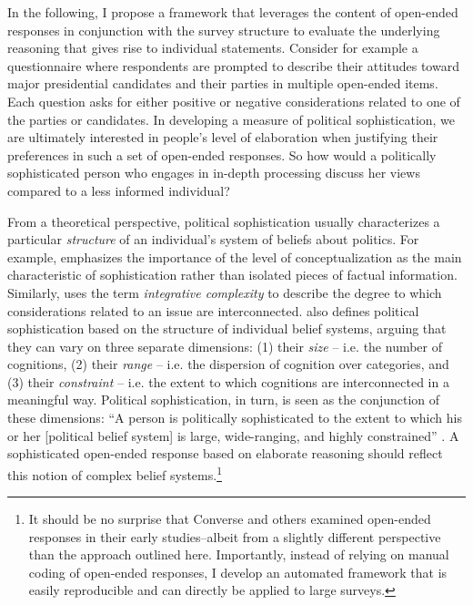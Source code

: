 In the following, I propose a framework that leverages the content of open-ended responses in conjunction with the survey structure to evaluate the underlying reasoning that gives rise to individual statements. Consider for example a questionnaire where respondents are prompted to describe their attitudes toward major presidential candidates and their parties in multiple open-ended items. Each question asks for either positive or negative considerations related to one of the parties or candidates. In developing a measure of political sophistication, we are ultimately interested in people's level of elaboration when justifying their preferences in such a set of open-ended responses. So how would a politically sophisticated person who engages in in-depth processing discuss her views compared to a less informed individual?

From a theoretical perspective, political sophistication usually characterizes a particular \textit{structure} of an individual's system of beliefs about politics. For example, \citet{converse1964nature} emphasizes the importance of the level of conceptualization as the main characteristic of sophistication rather than isolated pieces of factual information. Similarly, \citet{tetlock1983cognitive,tetlock1993cognitive} uses the term \textsl{integrative complexity} to describe the degree to which considerations related to an issue are interconnected. \citet{luskin1987measuring} also defines political sophistication based on the structure of individual belief systems, arguing that they can vary on three separate dimensions: (1) their \textsl{size} -- i.e. the number of cognitions, (2) their \textsl{range} -- i.e. the dispersion of cognition over categories, and (3) their \textsl{constraint} -- i.e. the extent to which cognitions are interconnected in a meaningful way. Political sophistication, in turn, is seen as the conjunction of these dimensions: ``A person is politically sophisticated to the extent to which his or her [political belief system] is large, wide-ranging, and highly constrained'' \citep[860]{luskin1987measuring}. A sophisticated open-ended response based on elaborate reasoning should reflect this notion of complex belief systems.\footnote{It should be no surprise that Converse and others examined open-ended responses in their early studies--albeit from a slightly different perspective than the approach outlined here. Importantly, instead of relying on manual coding of open-ended responses, I develop an automated framework that is easily reproducible and can directly be applied to large surveys.}

